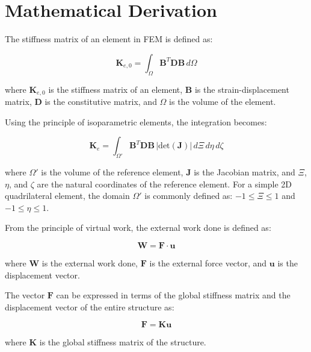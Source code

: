 
\chapter{Mathematical Derivation}
\label{chap:derivation}

The stiffness matrix of an element in FEM is defined as:

\begin{equation}
\label{eq:stiffness_matrix}
\mathbf{K}_{e,0} = \int_{\Omega} \mathbf{B}^T \mathbf{D} \mathbf{B} \, d\Omega
\end{equation}

where \(\mathbf{K}_{e,0}\) is the stiffness matrix of an element, \(\mathbf{B}\) is the strain-displacement matrix, \(\mathbf{D}\) is the constitutive matrix, and \(\Omega\) is the volume of the element.

Using the principle of isoparametric elements, the integration becomes:

\begin{equation}
\label{eq:stiffness_matrix2}
\mathbf{K}_e = \int_{\Omega'} \mathbf{B}^T \mathbf{D} \mathbf{B} \, |\text{det}(\mathbf{J})| \, d\Xi \, d\eta \, d\zeta
\end{equation}

where \(\Omega'\) is the volume of the reference element, \(\mathbf{J}\) is the Jacobian matrix, and \(\Xi\), \(\eta\), and \(\zeta\) are the natural coordinates of the reference element. For a simple 2D quadrilateral element, the domain \(\Omega'\) is commonly defined as: \(-1 \leq \Xi \leq 1\) and \(-1 \leq \eta \leq 1\).

From the principle of virtual work, the external work done is defined as:

\begin{equation}
\label{eq:compliance}
\mathbf{W} = \mathbf{F} \cdot \mathbf{u}
\end{equation}

where \(\mathbf{W}\) is the external work done, \(\mathbf{F}\) is the external force vector, and \(\mathbf{u}\) is the displacement vector.

The vector \(\mathbf{F}\) can be expressed in terms of the global stiffness matrix and the displacement vector of the entire structure as:

\begin{equation}
\label{eq:force}
\mathbf{F} = \mathbf{K} \mathbf{u}
\end{equation}

where \(\mathbf{K}\) is the global stiffness matrix of the structure.

